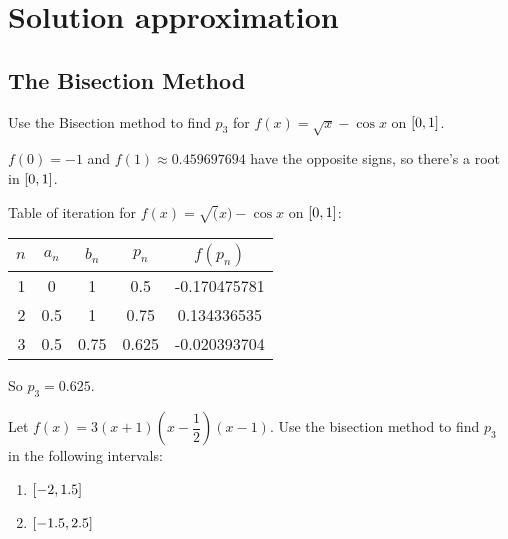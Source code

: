 \documentclass[../../Assignments.tex]{subfiles}
\begin{document}
\chapter{Solution approximation}

\section{The Bisection Method}

\begin{exercise}
    Use the Bisection method to find \(p_3\) for \(f(x) = \sqrt{x} - \cos{x}\) on \(\interval{0}{1}\).
\end{exercise}

\begin{solution}
    \(f(0) = -1\) and \(f(1) \approx \num{0.459697694}\) have the opposite
    signs, so there's a root in \(\interval{0}{1}\).

    Table of iteration for \(f(x) = \sqrt(x) - \cos{x}\) on \(\interval{0}{1}\):

    \begin{table}[hbt!]    %
        \centering
        \begin{tabular}{r S[table-format=1.1] S[table-format=1.2] S[table-format=1.3] S[table-format=-1.9]}
            \toprule
            \(n\)  &  {\(a_n\)}  &  {\(b_n\)}  &  {\(p_n\)}  &  {\(f(p_n)\)}  \\
              &  0          &  1          &  0.5        &  -0.170475781  \\
                2  &  0.5        &  1          &  0.75       &   0.134336535  \\
                3  &  0.5        &  0.75       &  0.625      &  -0.020393704  \\
            \bottomrule
        \end{tabular}
    \end{table}

    So \(p_3 = \num{0.625}\).
\end{solution}

\begin{exercise}
    Let \(f(x) = 3 (x + 1) (x - \dfrac{1}{2}) (x - 1)\). Use the bisection
    method to find \(p_3\) in the following intervals:

    \begin{enumerate}[label = (\alph*)]
        \item \(\interval{-2}{\num{1.5}}\)
        \item \(\interval{\num{-1.5}}{\num{2.5}}\)
    \end{enumerate}
\end{exercise}
\end{document}
